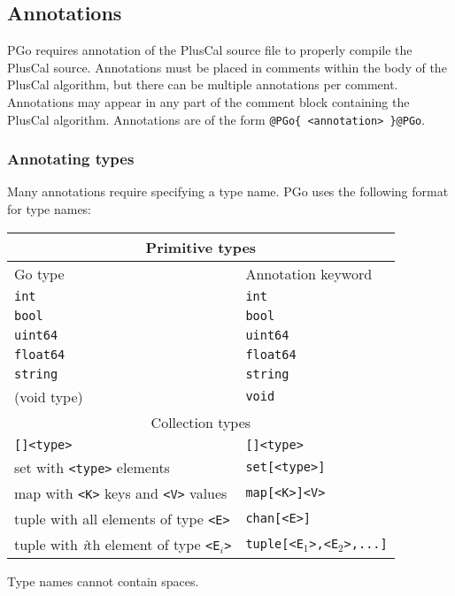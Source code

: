 \subsection{Annotations}
PGo requires annotation of the PlusCal source file to properly compile the PlusCal source. Annotations must be placed in comments within the body of the PlusCal algorithm, but there can be multiple annotations per comment. Annotations may appear in any part of the comment block containing the PlusCal algorithm. Annotations are of the form \verb|@PGo{ <annotation> }@PGo|.

\subsubsection{Annotating types}
Many annotations require specifying a type name. PGo uses the following format for type names:

\noindent
\begin{minipage}{\linewidth}
\centering
\begin{tabular}{l | l}
\multicolumn{2}{c}{Primitive types}\\
\hline
Go type 			& Annotation keyword\\
\hline
\texttt{int} 		& \texttt{int}\\
\texttt{bool} 		& \texttt{bool}\\
\texttt{uint64} 	& \texttt{uint64}\\
\texttt{float64} 	& \texttt{float64}\\
\texttt{string} 	& \texttt{string}\\
(void type) 		& \texttt{void}\\

\multicolumn{2}{c}{Collection types}\\
\hline
\texttt{[]<type>} 											& \texttt{[]<type>}\\
set with \texttt{<type>} elements							& \texttt{set[<type>]}\\
map with \texttt{<K>} keys and \texttt{<V>} values			& \texttt{map[<K>]<V>}\\
tuple with all elements of type \texttt{<E>}				& \texttt{chan[<E>]}\\
tuple with \emph{i}th element of type \texttt{<E$_i$>}		& \texttt{tuple[<E$_1$>,<E$_2$>,...]}
\end{tabular}
\end{minipage}

Type names cannot contain spaces.

